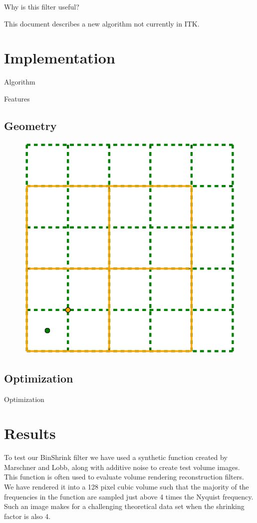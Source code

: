 \documentclass{InsightArticle}
\begin{document}
Why is this filter useful?


This document describes a new algorithm not currently in
ITK\cite{ITKSoftwareGuide}. 

\section{Implementation}

Algorithm

Features

\subsection{Geometry}


\begin{figure}
  \centering
  \includegraphics[width=0.8\linewidth]{images/pixelgrid}
  \label{fig:PixelGrid}
\end{figure}

\subsection{Optimization}
Optimization 


\section{Results}

To test our BinShrink filter we have used a synthetic function
created by Marschner and Lobb\cite{MarschnerL94}, along with additive
noise to create test volume images. This function is often used to
evaluate volume rendering reconstruction filters. We have rendered it
into a 128 pixel cubic volume such that the majority of the frequencies in
the function are sampled just above 4 times the Nyquist frequency. Such an image
makes for a challenging theoretical data set when the shrinking factor is also
4.
\end{document}

